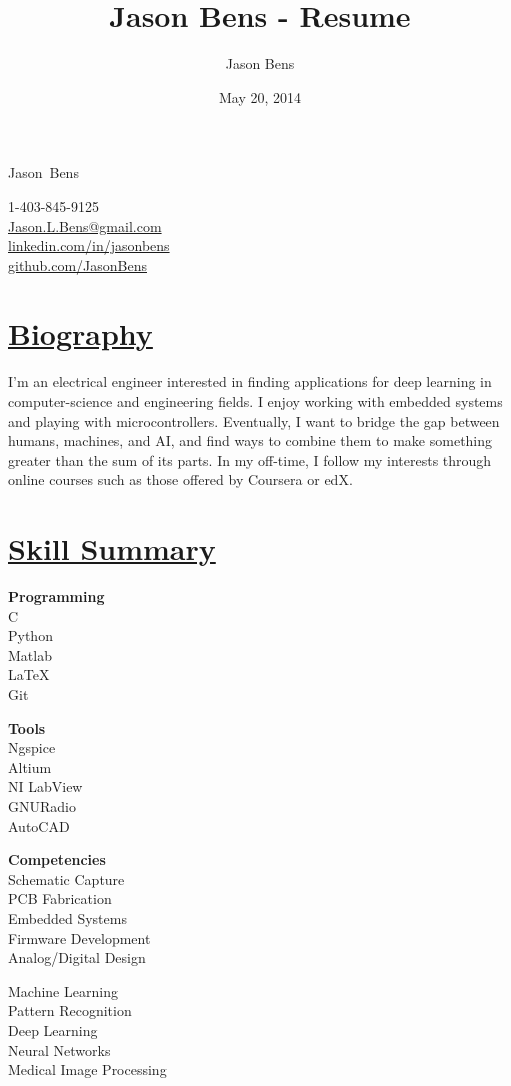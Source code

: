 \documentclass[a4paper, 11pt]{article}
\title{Jason Bens - Resume}
\author{Jason Bens}
\date{May 20, 2014}
\makeatletter
\newcommand {\firstname} {Jason}
\newcommand {\lastname} {Bens}
\newcommand {\phone} {\mbox{1-403-845-9125}}
\newcommand {\email} {\url{Jason.L.Bens@gmail.com}}
\newcommand {\linkedin} {\url{linkedin.com/in/jasonbens}}
\newcommand {\github} {\url{github.com/JasonBens}}
\makeatother
\begin{document}
\begin{minipage}[t]{0.7\textwidth}
  \begin{center}
    {\Huge \firstname~\lastname}
  \end{center}
\end{minipage}\hfill
\begin{minipage}{0.3\textwidth}
  \begin{flushright}
    \phone \\
    \email \\
    \linkedin \\
    \github \\
  \end{flushright}
\end{minipage}

\hrulefill

\section{\underline{Biography}}
I'm an electrical engineer interested in finding applications for deep learning in computer-science and engineering fields. I enjoy working with embedded systems and playing with microcontrollers. Eventually, I want to bridge the gap between humans, machines, and AI, and find ways to combine them to make something greater than the sum of its parts. In my off-time, I follow my interests through online courses such as those offered by Coursera or edX.

\section{\underline{Skill Summary}}
  \parbox{0.16\textwidth}{
    \textbf{Programming}\\
    C\\
    Python\\
    Matlab\\
    \LaTeX\\
    Git
  }\hfill
  \parbox{0.15\textwidth}{
    \textbf{Tools}\\
    Ngspice\\
    Altium\\
    NI LabView\\
    GNURadio\\
    AutoCAD
  } \hfill
  \parbox{0.25\textwidth}{
    \textbf{Competencies}\\
    Schematic Capture\\
    PCB Fabrication\\
    Embedded Systems\\
    Firmware Development\\
    Analog/Digital Design
  } \hfill
  \parbox{0.25\textwidth}{
    \bigskip
    Machine Learning\\
    Pattern Recognition\\
    Deep Learning\\
    Neural Networks\\
    Medical Image Processing
  } \hfill
\end{document}
